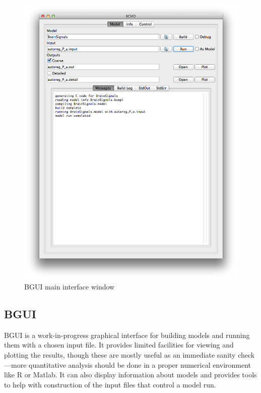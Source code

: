 \documentclass[a4paper,11pt]{article}
\begin{document}
\begin{figure}[tbph]
\begin{center}
\includegraphics[scale=0.5]{figures/mainwindow.png}
\caption{BGUI main interface window}
\label{fig:bgui:main}
\end{center}
\end{figure}

\subsection{BGUI}\label{bgui}

BGUI is a work-in-progress graphical interface for building models and running them with a chosen input file. It provides limited facilities for viewing and plotting the results, though these are mostly useful as an immediate sanity check---more quantitative analysis should be done in a proper numerical environment like R or Matlab. It can also display information about models and provides tools to help with construction of the input files that control a model run.
\end{document}
